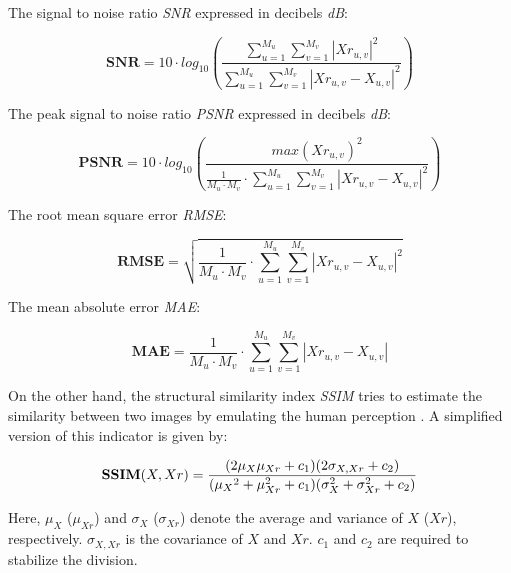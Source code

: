 The signal to noise ratio \emph{SNR} expressed in decibels \emph{dB}:

\begin{equation}
\label{eq:ImQuality_SNR}
	\mathbf{SNR} = 10 \cdot log_{10} \left( \frac{\sum_{u = 1}^{M_u}{ \sum_{v = 1}^{M_v}{ \left| Xr_{u,v} \right|^2 } }}{\sum_{u = 1}^{M_u}{ \sum_{v = 1}^{M_v}{ \left| Xr_{u,v} - X_{u,v} \right|^2 } }} \right)
\end{equation}

The peak signal to noise ratio \emph{PSNR} expressed in decibels \emph{dB}:

\begin{equation}
\label{eq:ImQuality_PSNR}
	\mathbf{PSNR} = 10 \cdot log_{10} \left( \frac{ max( Xr_{u,v} )^2 }{\frac{1}{M_u \cdot M_v} \cdot \sum_{u = 1}^{M_u}{ \sum_{v = 1}^{M_v}{ \left| Xr_{u,v} - X_{u,v} \right|^2 } }} \right)
\end{equation}


The root mean square error \emph{RMSE}:

\begin{equation}
\label{eq:ImQuality_RMSE}
	\mathbf{RMSE} = \sqrt{\frac{1}{M_u \cdot M_v} \cdot \sum_{u = 1}^{M_u}{ \sum_{v = 1}^{M_v}{ \left| Xr_{u,v} - X_{u,v} \right|^2 } }}
\end{equation}

The mean absolute error \emph{MAE}:

\begin{equation}
\label{eq:ImQuality_MAE}
	\mathbf{MAE} = \frac{1}{M_u \cdot M_v} \cdot \sum_{u = 1}^{M_u}{ \sum_{v = 1}^{M_v}{ \left| Xr_{u,v} - X_{u,v} \right| } }
\end{equation}

On the other hand, the structural similarity index \emph{SSIM} tries to estimate the similarity between two images by emulating the human perception \cite{Wang_2004_a}. A simplified version of this indicator is given by:

\begin{equation}
\label{eq:ImQuality_SSIM}
	\mathbf{SSIM}(X,Xr) = {(2\mu_{X} \mu_{Xr} +c_{1})(2{\sigma}_{X, {Xr}}+c_{2})\over ({\mu_X}^{2}+{\mu}_{Xr}^2+c_{1})({\sigma}_{X}^{2}+{\sigma}_{Xr}^{2}+c_{2})}
\end{equation}

Here, $\mu_{X}$ ($\mu_{Xr}$) and $\sigma_{X}$ ($\sigma_{Xr}$) denote the average and variance of $X$ ($Xr$), respectively. $\sigma_{X, Xr}$ is the covariance of $X$ and $Xr$. $c_{1}$ and $c_{2}$ are required to stabilize the division.

